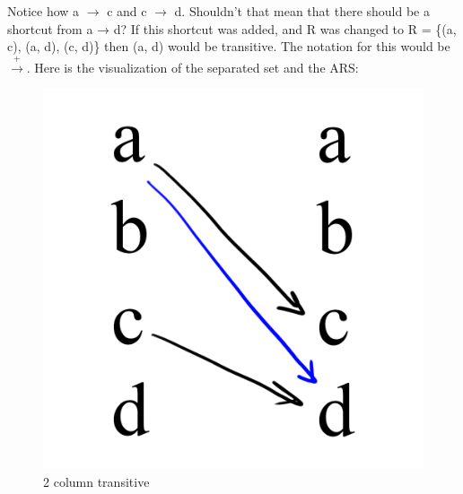 \documentclass{article}
\begin{document}
{\medskip\noindent
Notice how a $\rightarrow$ c and c $\rightarrow$ d. Shouldn’t that mean that there should be a shortcut from a → d? If this shortcut was added, and R was changed to R = \{(a, c), (a, d), (c, d)\} then (a, d) would be transitive. The notation for this would be $\xrightarrow{+}$. Here is the visualization of the separated set and the ARS:

\begin{figure}[h!]
  \centering
  \includegraphics[scale=0.06]{s5}
  \caption[] {
     2 column transitive
    \endtabular}
\end{figure}

}
\end{document}
